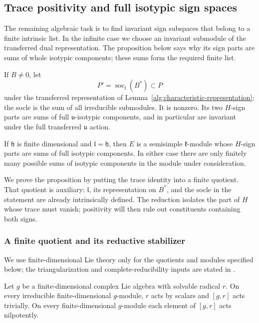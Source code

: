 \subsection{Trace positivity and full isotypic sign spaces}

The remaining algebraic task is to find invariant sign subspaces that
belong to a finite intrinsic list. In the infinite case we choose an
invariant submodule of the transferred dual representation. The
proposition below says why its sign parts are sums of whole isotypic
components; these sums form the required finite list.

\begin{proposition}
\label{alg:signs}
If $B\ne0$, let
\begin{equation}
 P'=\operatorname{soc}_{\mathfrak l}(B^*)\subset P
 \label{alg:socle}
\end{equation}
under the transferred representation of
Lemma~\ref{alg:characteristic-representation}; the socle is the sum of all
irreducible submodules. It is nonzero. Its two $H$-sign parts are
sums of full $\mathfrak u$-isotypic components, and in particular
are invariant under the full transferred $\mathfrak u$ action.

If $\mathfrak h$ is finite dimensional and $\mathfrak l=\mathfrak h$,
then $E$ is a semisimple $\mathfrak k$-module whose $H$-sign parts
are sums of full isotypic components. In either case there are only
finitely many possible sums of isotypic components in the module
under consideration.
\end{proposition}

We prove the proposition by putting the trace identity into a finite
quotient. That quotient is auxiliary: $\mathfrak l$, its representation
on $B^*$, and the socle in the statement are already intrinsically
defined. The reduction isolates the part of $H$ whose trace must vanish;
positivity will then rule out constituents containing both signs.

\subsubsection{A finite quotient and its reductive stabilizer}

We use finite-dimensional Lie theory only for the quotients and modules
specified below; the triangularization and complete-reducibility inputs
are stated in \citet[Theorems~I.3.7 and~I.5.20(b)]{Milne2013}.

\begin{lemma}
\label{alg:radical-action}
Let $g$ be a finite-dimensional complex Lie algebra with solvable
radical $r$. On every irreducible finite-dimensional $g$-module,
$r$ acts by scalars and $[g,r]$ acts trivially. On every
finite-dimensional $g$-module each element of $[g,r]$ acts
nilpotently.
\end{lemma}

